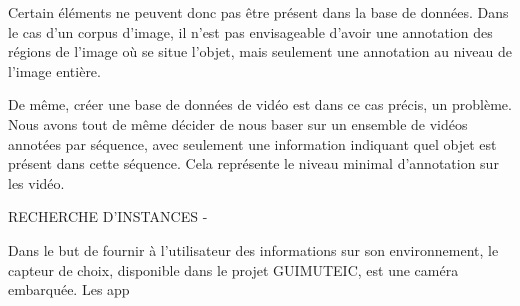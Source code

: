 Certain éléments ne peuvent donc pas être présent dans la base de données. Dans le cas d'un corpus d'image, il n'est pas envisageable d'avoir une annotation des régions de l'image où se situe l'objet, mais seulement une annotation au niveau de l'image entière. 

De même, créer une base de données de vidéo est dans ce cas précis, un problème. Nous avons tout de même décider de nous baser sur un ensemble de vidéos annotées par séquence, avec seulement une information indiquant quel objet est présent dans cette séquence. Cela représente le niveau minimal d'annotation sur les vidéo.


RECHERCHE D'INSTANCES - 

Dans le but de fournir à l'utilisateur des informations sur son environnement, le capteur de choix, disponible dans le projet GUIMUTEIC, est une caméra embarquée. Les app


